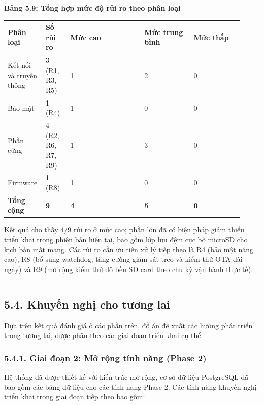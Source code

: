 \documentclass[13pt,a4paper]{extarticle}
\newcounter{none} %
\newcommand{\thesislongtableorignewline}{}
\let\thesislongtableorignewline\\
\renewcommand{\\}{\thesislongtableorignewline\hline}%
\let\\\thesislongtableorignewline
\newcommand{\thesistabletitle}[1]{%
  \begin{center}\textbf{#1}\end{center}%
}
\begin{document}
\thesistabletitle{Bảng 5.9: Tổng hợp mức độ rủi ro theo phân loại}

{\def\LTcaptype{none} %
\begin{longtable}{|p{0.12\linewidth}|p{0.10\linewidth}|p{0.30\linewidth}|p{0.20\linewidth}|p{0.20\linewidth}|}
\hline \textbf{Phân loại} & \textbf{Số rủi ro} & \textbf{Mức cao} & \textbf{Mức trung bình} & \textbf{Mức thấp} \\
\hline
\endhead
\hline
\endlastfoot
Kết nối và truyền thông & 3 (R1, R3, R5) & 1 & 2 & 0 \\
Bảo mật & 1 (R4) & 1 & 0 & 0 \\
Phần cứng & 4 (R2, R6, R7, R9) & 1 & 3 & 0 \\
Firmware & 1 (R8) & 1 & 0 & 0 \\
\textbf{Tổng cộng} & \textbf{9} & \textbf{4} & \textbf{5} &
\textbf{0} \\
\end{longtable}
}

Kết quả cho thấy 4/9 rủi ro ở mức cao; phần lớn đã có biện pháp giảm
thiểu triển khai trong phiên bản hiện tại, bao gồm lớp lưu đệm cục bộ
microSD cho kịch bản mất mạng. Các rủi ro cần ưu tiên xử lý tiếp theo là
R4 (bảo mật nâng cao), R8 (bổ sung watchdog, tăng cường giám sát treo và
kiểm thử OTA dài ngày) và R9 (mở rộng kiểm thử độ bền SD card theo chu
kỳ vận hành thực tế).

\begin{center}\rule{0.5\linewidth}{0.5pt}\end{center}

\subsection{5.4. Khuyến nghị cho tương
lai}\label{54-khuyux1ebfn-nghux1ecb-cho-tux1b0ux1a1ng-lai}

Dựa trên kết quả đánh giá ở các phần trên, đồ án đề xuất các hướng phát
triển trong tương lai, được phân theo các giai đoạn triển khai cụ thể.

\subsubsection{5.4.1. Giai đoạn 2: Mở rộng tính năng (Phase
2)}\label{541-giai-ux111oux1ea1n-2-mux1edf-rux1ed9ng-tuxednh-nux103ng-phase-2}

Hệ thống đã được thiết kế với kiến trúc mở rộng, cơ sở dữ liệu
PostgreSQL đã bao gồm các bảng dữ liệu cho các tính năng Phase 2. Các
tính năng khuyến nghị triển khai trong giai đoạn tiếp theo bao gồm:
\end{document}
